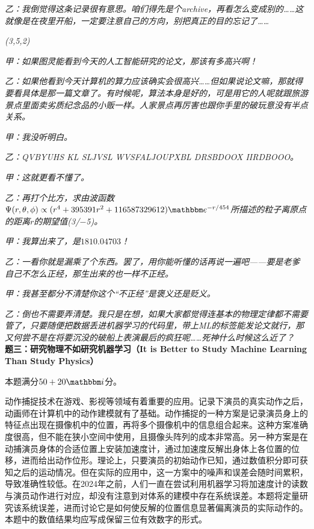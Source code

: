 \documentclass[11pt,a4paper,onecolumn,UTF8]{ctexart}
\begin{document}
	\textit{乙：我倒觉得这条记录很有意思。咱们得先是个archive，再看怎么变成别的……这就像是在夜里开船，一定要注意自己的方向，别把真正的目的忘记了……}
	
	\textit{(3,5,2)}
	
	\textit{甲：如果图灵能看到今天的人工智能研究的论文，那该有多高兴啊！}
	
	\textit{乙：如果他看到今天计算机的算力应该确实会很高兴……但如果说论文嘛，那就得要看具体是那一篇文章了。有时候呢，算法本身是好的，可是用它的人呢就跟旅游景点里面卖劣质纪念品的小贩一样。人家景点再厉害也跟你手里的破玩意没有半点关系。}
	
	\textit{甲：我没听明白。}
	
	\textit{乙：QVBYUHS KL SLJVSL WVSFALJOUPXBL DRSBDOOX IIRDBOOO。}
	
	\textit{甲：这就更看不懂了。}
	
	\textit{乙：再打个比方，求由波函数$\Psi(r,\theta,\phi)\propto(r^4+395391r^2+116587329612)\ue^{-r/454}$所描述的粒子离原点的距离$r$的期望值(3/$-$5)。}
	
	\textit{甲：我算出来了，是$1810.04703$！}
	
	\textit{乙：一看你就是漏乘了个东西。罢了，用你能听懂的话再说一遍吧——要是老爹自己不怎么正经，那生出来的也一样不正经。}
	
	\textit{甲：我甚至都分不清楚你这个“不正经”是褒义还是贬义。}
	
	\textit{乙：倒也不需要弄清楚。我只是在想，如果大家都觉得连基本的物理定律都不需要管了，只要随便把数据丢进机器学习的代码里，带上ML的标签能发论文就行，那又何尝不是在将要沉没的破船上表演最后的疯狂呢……死神什么时候这么近了？}\\
	
	\noindent
	\textbf{题三：研究物理不如研究机器学习（It is Better to Study Machine Learning Than Study Physics）}
	
	本题满分$50+20\ui$分。
	
	动作捕捉技术在游戏、影视等领域有着重要的应用。记录下演员的真实动作之后，动画师在计算机中的动作建模就有了基础。动作捕捉的一种方案是记录演员身上的特征点出现在摄像机中的位置，再将多个摄像机中的信息组合起来。这种方案准确度很高，但不能在狭小空间中使用，且摄像头阵列的成本非常高。另一种方案是在动捕演员身体的合适位置上安装加速度计，通过加速度反解出身体上各位置的位移，进而给出动作位形。理论上，只要演员的初始动作已知，通过数值积分即可获知之后的运动情况。但在实际的应用中，这一方案中的噪声和误差会随时间累积，导致准确性较低。在2024年之前，人们一直在尝试利用机器学习将加速度计的读数与演员动作进行对应，却没有注意到对体系的建模中存在系统误差。本题将定量研究该系统误差，进而讨论它是如何使反解的位置信息显著偏离演员的实际动作的。本题中的数值结果均应写成保留三位有效数字的形式。
	
\end{document}
